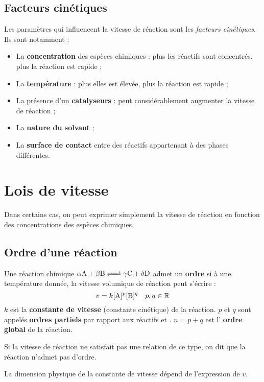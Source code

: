 \documentclass{cours}
\begin{document}
\subsection{Facteurs cinétiques}%
\label{sub:facteurs_cinetiques}
Les paramètres qui influencent la vitesse de réaction sont les \emph{facteurs cinétiques}. Ils sont notamment :
\begin{itemize}
  \item La \textbf{concentration} des espèces chimiques : plus les réactifs sont concentrés, plus la réaction est rapide ;
  \item La \textbf{température} : plus elles est élevée, plus la réaction est rapide ;
  \item La présence d'un \textbf{catalyseurs} : peut considérablement augmenter la vitesse de réaction ;
  \item La \textbf{nature du solvant} ;
  \item La \textbf{surface de contact} entre des réactifs appartenant à des phases différentes.  
\end{itemize}


\section{Lois de vitesse}%
\label{sec:lois_de_vitesse}

Dans certains cas, on peut exprimer simplement la vitesse de réaction en fonction des concentrations des espèces chimiques.

\subsection{Ordre d'une réaction}%
\label{sub:ordre_d_une_reaction}

Une réaction chimique $\ce{\alpha A + \beta B <=> \gamma C + \delta D}$ admet un \textbf{ordre} si à une température donnée, la vitesse volumique de réaction peut s'écrire :
%
\[
v = k[\ce{A}]^p[\ce{B}]^q \quad p, q \in \mathbb{R}
\]
%
$k$ est la \textbf{constante de vitesse} (constante cinétique) de la réaction. $p$ et $q$ sont appelés \textbf{ordres partiels} par rapport aux réactifs  et . $n=p+q$ est l' \textbf{ordre global} de la réaction.  

Si la vitesse de réaction ne satisfait pas une relation de ce type, on dit que la réaction n'admet pas d'ordre.

La dimension physique de la constante de vitesse dépend de l'expression de $v$. 
\end{document}
